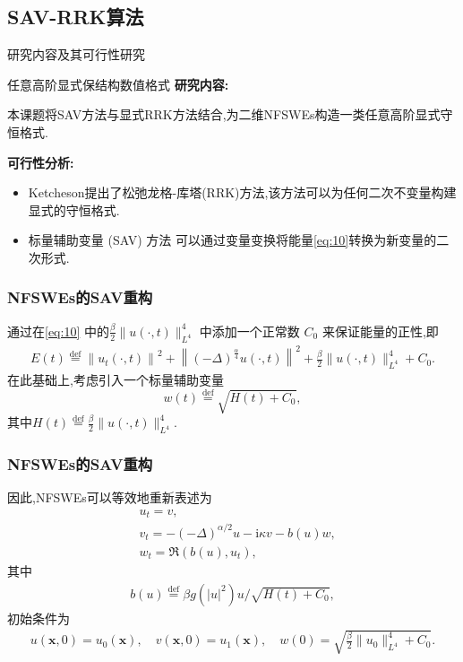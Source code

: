 \documentclass[aspectratio=169]{beamer}
\numberwithin{theorem}{section} %
\begin{document}
\subsection{SAV-RRK算法}
\begin{frame}{研究内容及其可行性研究}
	\begin{block}{任意高阶显式保结构数值格式}
		\textbf{\textcolor[rgb]{0.227,0.373,0.306}{研究内容:}}
		
		{\footnotesize 本课题将SAV方法与显式RRK方法结合,为二维NFSWEs构造一类任意高阶显式守恒格式.}
		
		\textbf{\textcolor[rgb]{0.227,0.373,0.306}{可行性分析:}}
		\begin{itemize}
			\item {\footnotesize Ketcheson\cite{ketchesonRelaxationRungeKutta2019}提出了松弛龙格-库塔(RRK)方法,该方法可以为任何二次不变量构建显式的守恒格式.}%
			\item {\footnotesize 标量辅助变量 (SAV) 方法 \cite{chengConvergenceEnergyconservingScheme2022} 可以通过变量变换将能量\eqref{eq:10}转换为新变量的二次形式.}%
			\end{itemize}
	\end{block}
	\end{frame}
	
\begin{frame}\frametitle{NFSWEs的SAV重构}
	通过在\eqref{eq:10} 中的$\frac{\beta}{2}\|u(\cdot, t)\|_{L^{4}}^{4}$ 中添加一个正常数 $C_0$ 来保证能量的正性,即
	\begin{align}\label{eq_SAVRRK:9_1}
		E(t)\overset{\text{def}}{=}\left\|u_{t}(\cdot, t)\right\|^{2}+\left\|(-\Delta)^{\frac{\alpha}{4}} u(\cdot, t)\right\|^{2}+\frac{\beta}{2}\|u(\cdot, t)\|_{L^{4}}^{4} + C_0.
	\end{align}
	在此基础上,考虑引入一个标量辅助变量
	\begin{equation}
		w(t)\overset{\text{def}}{=}\sqrt{H(t)+C_0},
	\end{equation}
	其中$H(t)\overset{\text{def}}{=}\frac{\beta}{2}\|u(\cdot, t)\|_{L^{4}}^{4} .$
\end{frame}

\begin{frame}\frametitle{NFSWEs的SAV重构}
因此,NFSWEs可以等效地重新表述为
\begin{align}
& u_t=v, \label{eq_SAVRRK:2-2}\\
& v_t=-(-\Delta)^{\alpha / 2} u-\mathrm{i}\kappa v-b(u) w, \label{eq_SAVRRK:2-3}\\
& w_t=\Re\left(b(u), u_t\right),\label{eq_SAVRRK:2-4}
\end{align}
其中
\begin{align}
b(u)\overset{\text{def}}{=}\beta g(|u|^2) u / \sqrt{H(t)+C_0},
\end{align}
初始条件为
\begin{align}\label{eq_SAVRRK:31}
	u(\boldsymbol{x}, 0)=u_{0}(\boldsymbol{x}), \quad v(\boldsymbol{x}, 0)=u_{1}(\boldsymbol{x}), \quad w(0)=\sqrt{\frac{\beta}{2}\|u_{0}\|_{L^{4}}^{4} +C_0}.
\end{align}
\end{frame}
\end{document}
